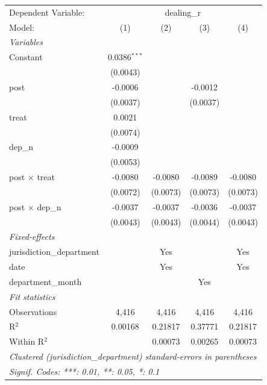 \begingroup
\centering
\begin{tabular}{lcccc}
   \tabularnewline \midrule \midrule
   Dependent Variable: & \multicolumn{4}{c}{dealing\_r}\\
   Model:                    & (1)            & (2)      & (3)      & (4)\\  
   \midrule
   \emph{Variables}\\
   Constant                  & 0.0386$^{***}$ &          &          &   \\   
                             & (0.0043)       &          &          &   \\   
   post                      & -0.0006        &          & -0.0012  &   \\   
                             & (0.0037)       &          & (0.0037) &   \\   
   treat                     & 0.0021         &          &          &   \\   
                             & (0.0074)       &          &          &   \\   
   dep\_n                    & -0.0009        &          &          &   \\   
                             & (0.0053)       &          &          &   \\   
   post $\times$ treat       & -0.0080        & -0.0080  & -0.0089  & -0.0080\\   
                             & (0.0072)       & (0.0073) & (0.0073) & (0.0073)\\   
   post $\times$ dep\_n      & -0.0037        & -0.0037  & -0.0036  & -0.0037\\   
                             & (0.0043)       & (0.0043) & (0.0044) & (0.0043)\\   
   \midrule
   \emph{Fixed-effects}\\
   jurisdiction\_department  &                & Yes      &          & Yes\\  
   date                      &                & Yes      &          & Yes\\  
   department\_month         &                &          & Yes      & \\  
   \midrule
   \emph{Fit statistics}\\
   Observations              & 4,416          & 4,416    & 4,416    & 4,416\\  
   R$^2$                     & 0.00168        & 0.21817  & 0.37771  & 0.21817\\  
   Within R$^2$              &                & 0.00073  & 0.00265  & 0.00073\\  
   \midrule \midrule
   \multicolumn{5}{l}{\emph{Clustered (jurisdiction\_department) standard-errors in parentheses}}\\
   \multicolumn{5}{l}{\emph{Signif. Codes: ***: 0.01, **: 0.05, *: 0.1}}\\
\end{tabular}
\par\endgroup
